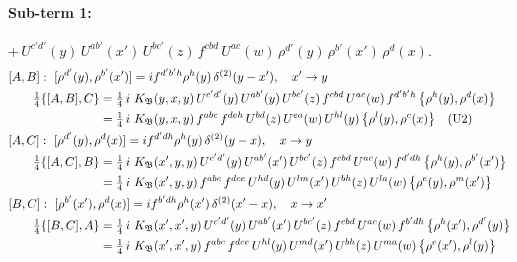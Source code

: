 \documentclass[10pt]{article}
\numberwithin{equation}{section}
\begin{document}
\paragraph{Sub-term 1:} $+\,U^{c'd'}(y)\,U^{ab'}(x')\,U^{bc'}(z)\,f^{cbd}\,U^{ac}(w)\,\rho^{d'}(y)\,\rho^{b'}(x')\,\rho^{d}(x)$.
\begin{align}
&[A,B]:\ [\rho^{d'}(y),\rho^{b'}(x')]=i f^{d'b'h}\rho^{h}(y)\,\delta^{(2)}(y-x'),\quad x'\to y\notag\\
&\qquad \tfrac14\{[A,B],C\}=\tfrac14\,i\,\,K_{\mathfrak B}(y,x,y)\,U^{c'd'}(y)\,U^{ab'}(y)\,U^{bc'}(z)\,f^{cbd}\,U^{ac}(w)\,f^{d'b'h}\,\big\{\rho^{h}(y),\rho^{d}(x)\big\}\notag\\
&\qquad\phantom{\tfrac14\{[A,B],C\}}=\tfrac14\,i\,\,K_{\mathfrak B}(y,x,y)\,f^{abc}\,f^{deh}\,U^{bd}(z)\,U^{ea}(w)\,U^{hl}(y)\,\big\{\rho^{l}(y),\rho^{c}(x)\big\}\quad\text{(U2)}
\label{R:eq:GIII.II-1-AB}\\
&[A,C]:\ [\rho^{d'}(y),\rho^{d}(x)]=i f^{d'dh}\rho^{h}(y)\,\delta^{(2)}(y-x),\quad x\to y\notag\\
&\qquad \tfrac14\{[A,C],B\}=\tfrac14\,i\,\,K_{\mathfrak B}(x',y,y)\,U^{c'd'}(y)\,U^{ab'}(x')\,U^{bc'}(z)\,f^{cbd}\,U^{ac}(w)\,f^{d'dh}\,\big\{\rho^{h}(y),\rho^{b'}(x')\big\}\notag\\
&\qquad\phantom{\tfrac14\{[A,C],B\}}=\tfrac14\,i\,\,K_{\mathfrak B}(x',y,y)\,f^{abc}\,f^{dce}\,U^{hd}(y)\,U^{lm}(x')\,U^{bh}(z)\,U^{la}(w)\,\big\{\rho^{e}(y),\rho^{m}(x')\big\}
\label{R:eq:GIII.II-1-AC}\\
&[B,C]:\ [\rho^{b'}(x'),\rho^{d}(x)]=i f^{b'dh}\rho^{h}(x')\,\delta^{(2)}(x'-x),\quad x\to x'\notag\\
&\qquad \tfrac14\{[B,C],A\}=\tfrac14\,i\,\,K_{\mathfrak B}(x',x',y)\,U^{c'd'}(y)\,U^{ab'}(x')\,U^{bc'}(z)\,f^{cbd}\,U^{ac}(w)\,f^{b'dh}\,\big\{\rho^{h}(x'),\rho^{d'}(y)\big\}\notag\\
&\qquad\phantom{\tfrac14\{[B,C],A\}}=\tfrac14\,i\,\,K_{\mathfrak B}(x',x',y)\,f^{abc}\,f^{dce}\,U^{hl}(y)\,U^{md}(x')\,U^{bh}(z)\,U^{ma}(w)\,\big\{\rho^{e}(x'),\rho^{l}(y)\big\}
\label{R:eq:GIII.II-1-BC}
\end{align}
\end{document}
